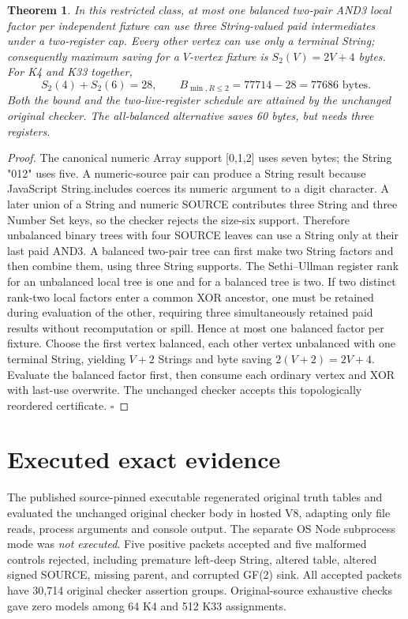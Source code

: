 \documentclass{article}
\newtheorem{theorem}{Theorem}
\begin{document}
\begin{theorem}
In this restricted class, at most one balanced two-pair AND3 local factor per independent fixture can use three String-valued paid intermediates under a two-register cap. Every other vertex can use only a terminal String; consequently maximum saving for a \(V\)-vertex fixture is \(S_2(V)=2V+4\) bytes. For K4 and K33 together,
\[
S_2(4)+S_2(6)=28,\qquad
B_{\min,R\le 2}=77714-28=\boxed{77686\text{ bytes}}.
\]
Both the bound and the two-live-register schedule are attained by the unchanged original checker. The all-balanced alternative saves 60 bytes, but needs three registers.
\end{theorem}
\begin{proof}
The canonical numeric Array support [0,1,2] uses seven bytes; the String "012" uses five. A numeric-source pair can produce a String result because JavaScript String.includes coerces its numeric argument to a digit character. A later union of a String and numeric SOURCE contributes three String and three Number Set keys, so the checker rejects the size-six support. Therefore unbalanced binary trees with four SOURCE leaves can use a String only at their last paid AND3. A balanced two-pair tree can first make two String factors and then combine them, using three String supports. The Sethi--Ullman register rank for an unbalanced local tree is one and for a balanced tree is two. If two distinct rank-two local factors enter a common XOR ancestor, one must be retained during evaluation of the other, requiring three simultaneously retained paid results without recomputation or spill. Hence at most one balanced factor per fixture. Choose the first vertex balanced, each other vertex unbalanced with one terminal String, yielding \(V+2\) Strings and byte saving \(2(V+2)=2V+4\). Evaluate the balanced factor first, then consume each ordinary vertex and XOR with last-use overwrite. The unchanged checker accepts this topologically reordered certificate. \(\square\)
\end{proof}

\section*{Executed exact evidence}
The published source-pinned executable regenerated original truth tables and evaluated the unchanged original checker body in hosted V8, adapting only file reads, process arguments and console output. The separate OS Node subprocess mode was \emph{not executed}. Five positive packets accepted and five malformed controls rejected, including premature left-deep String, altered table, altered signed SOURCE, missing parent, and corrupted GF(2) sink. All accepted packets have 30,714 original checker assertion groups. Original-source exhaustive checks gave zero models among 64 K4 and 512 K33 assignments.
\end{document}
